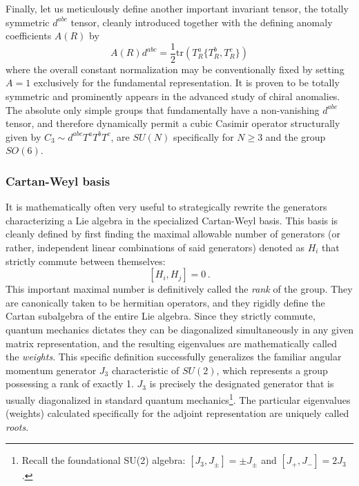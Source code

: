 Finally, let us meticulously define another important invariant tensor, the totally symmetric \(d^{abc}\) tensor, cleanly introduced together with the defining anomaly coefficients \(A(R)\) by
\begin{equation} \label{eq:anomaly_d_tensor}
    A(R) d^{abc} = \frac{1}{2} \mathrm{tr} \left( T_R^a \{T_R^b, T_R^c\} \right)
\end{equation}
where the overall constant normalization may be conventionally fixed by setting \(A = 1\) exclusively for the fundamental representation. It is proven to be totally symmetric and prominently appears in the advanced study of chiral anomalies. The absolute only simple groups that fundamentally have a non-vanishing \(d^{abc}\) tensor, and therefore dynamically permit a cubic Casimir operator structurally given by \(C_3 \sim d^{abc} T^a T^b T^c\), are \(SU(N)\) specifically for \(N \ge 3\) and the group \(SO(6)\).

\subsubsection{Cartan-Weyl basis}

It is mathematically often very useful to strategically rewrite the generators characterizing a Lie algebra in the specialized Cartan-Weyl basis. This basis is cleanly defined by first finding the maximal allowable number of generators (or rather, independent linear combinations of said generators) denoted as \(H_i\) that strictly commute between themselves:
\begin{equation} \label{eq:cartan_commute}
    [H_i, H_j] = 0 \, .
\end{equation}
This important maximal number is definitively called the \textit{rank} of the group. They are canonically taken to be hermitian operators, and they rigidly define the Cartan subalgebra of the entire Lie algebra. Since they strictly commute, quantum mechanics dictates they can be diagonalized simultaneously in any given matrix representation, and the resulting eigenvalues are mathematically called the \textit{weights}. This specific definition successfully generalizes the familiar angular momentum generator \(J_3\) characteristic of \(SU(2)\), which represents a group possessing a rank of exactly 1. \(J_3\) is precisely the designated generator that is usually diagonalized in standard quantum mechanics\footnote{Recall the foundational SU(2) algebra: \([J_3, J_\pm] = \pm J_\pm\) and \([J_+, J_-] = 2J_3\).}. The particular eigenvalues (weights) calculated specifically for the adjoint representation are uniquely called \textit{roots}.

